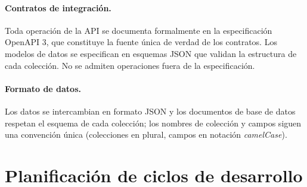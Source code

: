 \documentclass[doc,12pt,a4paper]{apa7}
\begin{document}
\paragraph{Contratos de integración.}
Toda operación de la API se documenta formalmente en la especificación OpenAPI 3,
que constituye la fuente única de verdad de los contratos. Los modelos de datos
se especifican en esquemas JSON que validan la estructura de cada colección. No
se admiten operaciones fuera de la especificación.

\paragraph{Formato de datos.}
Los datos se intercambian en formato JSON y los documentos de base de datos
respetan el esquema de cada colección; los nombres de colección y campos siguen
una convención única (colecciones en plural, campos en notación \emph{camelCase}).

\section{Planificación de ciclos de desarrollo}
\end{document}
